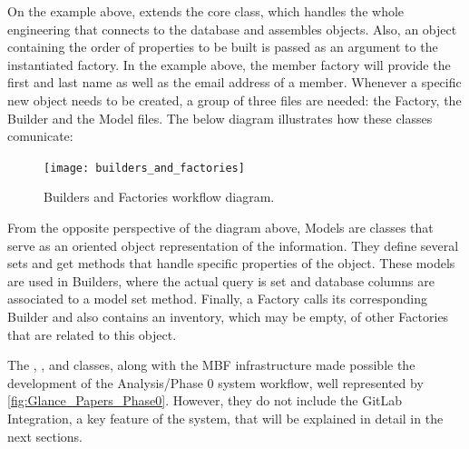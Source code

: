 On the example above,  extends the core  class, which handles the whole engineering that connects to the database and assembles objects. Also, an object containing the order of properties to be built is passed as an argument to the instantiated factory. In the example above, the member factory will provide the first and last name as well as the email address of a member.
Whenever a specific new object needs to be created, a group of three files are needed: the Factory, the Builder and the Model files. The below diagram illustrates how these classes comunicate:
\begin{figure}[htb]
    \centering
    \texttt{[image: builders\_and\_factories]}
    \caption{Builders and Factories workflow diagram.}%
    \label{fig:builders_and_factories}
\end{figure}
From the opposite perspective of the diagram above, Models are classes that serve as an oriented object representation of the information. They define several sets and get methods that handle specific properties of the object. These models are used in Builders, where the actual query is set and database columns are associated to a model set method. Finally, a Factory calls its corresponding Builder and also contains an inventory, which may be empty, of other Factories that are related to this object.

The , ,  and  classes, along with the MBF infrastructure made possible the development of the Analysis/Phase 0 system workflow, well represented by \cref{fig:Glance_Papers_Phase0}.
However, they do not include the GitLab Integration, a key feature of the system, that will be explained in detail in the next sections.

